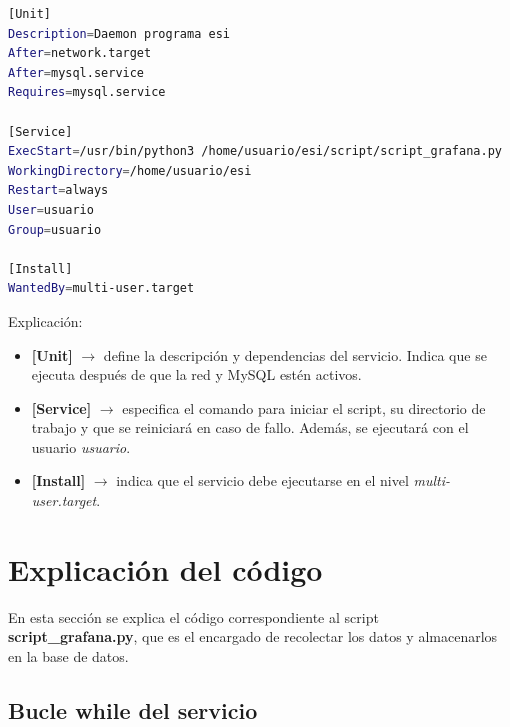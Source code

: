 \documentclass{article}
\begin{document}
\begin{lstlisting}[language=bash]
[Unit]
Description=Daemon programa esi
After=network.target
After=mysql.service
Requires=mysql.service

[Service]
ExecStart=/usr/bin/python3 /home/usuario/esi/script/script_grafana.py
WorkingDirectory=/home/usuario/esi
Restart=always
User=usuario
Group=usuario

[Install]
WantedBy=multi-user.target 
\end{lstlisting}

\vspace{0.4cm}
Explicación:

\begin{itemize}
    \item \textbf{[Unit]} $ \rightarrow $ define la descripción y dependencias del servicio. Indica que se ejecuta después de que la red y MySQL estén activos.
    \item \textbf{[Service]} $ \rightarrow $ especifica el comando para iniciar el script, su directorio de trabajo y que se reiniciará en caso de fallo. Además, se ejecutará con el usuario \textit{usuario}.
    \item \textbf{[Install]} $ \rightarrow $ indica que el servicio debe ejecutarse en el nivel \textit{multi-user.target}.
\end{itemize}

\section{Explicación del código} \cite{programacionpython80889555} \cite{psutil}
En esta sección se explica el código correspondiente al script \textbf{script\_grafana.py}, que es el encargado de recolectar los datos y almacenarlos en la base de datos.
\subsection{Bucle while del servicio}\label{subsec:bucle-while}
\end{document}
